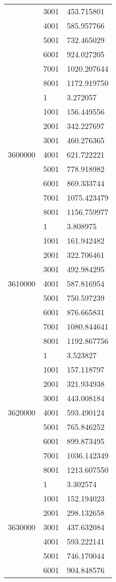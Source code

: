 \begin{table}[htb!]
\begin{tabular}{lll}
 & 3001 & 453.715801 \\
 & 4001 & 585.957766 \\
 & 5001 & 732.465029 \\
 & 6001 & 924.027205 \\
 & 7001 & 1020.207644 \\
 & 8001 & 1172.919750 \\
\multirow[c]{9}{*}{3600000} & 1 & 3.272057 \\
 & 1001 & 156.449556 \\
 & 2001 & 342.227697 \\
 & 3001 & 460.276365 \\
 & 4001 & 621.722221 \\
 & 5001 & 778.918982 \\
 & 6001 & 869.333744 \\
 & 7001 & 1075.423479 \\
 & 8001 & 1156.759977 \\
\multirow[c]{9}{*}{3610000} & 1 & 3.808975 \\
 & 1001 & 161.942482 \\
 & 2001 & 322.706461 \\
 & 3001 & 492.984295 \\
 & 4001 & 587.816954 \\
 & 5001 & 750.597239 \\
 & 6001 & 876.665831 \\
 & 7001 & 1080.844641 \\
 & 8001 & 1192.867756 \\
\multirow[c]{9}{*}{3620000} & 1 & 3.523827 \\
 & 1001 & 157.118797 \\
 & 2001 & 321.934938 \\
 & 3001 & 443.008184 \\
 & 4001 & 593.490124 \\
 & 5001 & 765.846252 \\
 & 6001 & 899.873495 \\
 & 7001 & 1036.142349 \\
 & 8001 & 1213.607550 \\
\multirow[c]{9}{*}{3630000} & 1 & 3.302574 \\
 & 1001 & 152.194023 \\
 & 2001 & 298.132658 \\
 & 3001 & 437.632084 \\
 & 4001 & 593.222141 \\
 & 5001 & 746.170044 \\
 & 6001 & 904.848576 \\

\end{tabular}
\end{table}
